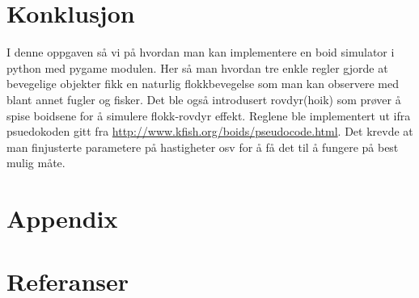 {\section{Konklusjon}

I denne oppgaven så vi på hvordan man kan implementere en boid simulator i python med pygame modulen. Her så man hvordan tre enkle regler gjorde at bevegelige objekter fikk en naturlig flokkbevegelse som man kan observere med blant annet fugler og fisker. Det ble også introdusert rovdyr(hoik) som prøver å spise boidsene for å simulere flokk-rovdyr effekt. Reglene ble implementert ut ifra psuedokoden gitt fra \url{http://www.kfish.org/boids/pseudocode.html}. Det krevde at man finjusterte parametere på hastigheter osv for å få det til å fungere på best mulig måte.





\newpage
\section{Appendix}
\section{Referanser}
\begingroup
\renewcommand{\section}[2]{}%


\endgroup



 







